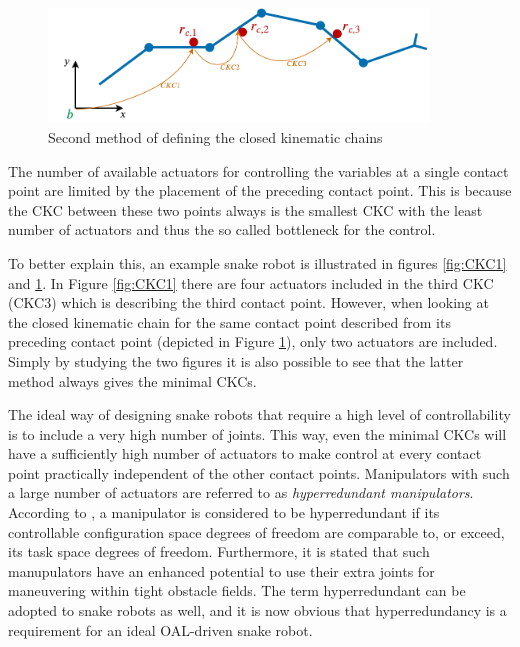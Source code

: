 \begin{figure}
    \centering
    \includegraphics[width=0.9\textwidth]{figures/theory/CKC2.pdf}
    \caption{Second method of defining the closed kinematic chains}
    \label{fig:CKC2}
\end{figure}

The number of available actuators for controlling the variables at a single contact point are limited by the placement of the preceding contact point. This is because the CKC between these two points always is the smallest CKC with the least number of actuators and thus the so called bottleneck for the control.

To better explain this, an example snake robot is illustrated in figures \ref{fig:CKC1} and \ref{fig:CKC2}. In Figure \ref{fig:CKC1} there are four actuators included in the third CKC (CKC3) which is describing the third contact point. However, when looking at the closed kinematic chain for the same contact point described from its preceding contact point (depicted in Figure \ref{fig:CKC2}), only two actuators are included. Simply by studying the two figures it is also possible to see that the latter method always gives the minimal CKCs.

The ideal way of designing snake robots that require a high level of controllability is to include a very high number of joints. This way, even the minimal CKCs will have a sufficiently high number of actuators to make control at every contact point practically independent of the other contact points. Manipulators with such a large number of actuators are referred to as \textit{hyperredundant manipulators}. According to \cite{chiaverini2008kinematically}, a manipulator is considered to be hyperredundant if its controllable configuration space degrees of freedom are comparable to, or exceed, its task space degrees of freedom. Furthermore, it is stated that such manupulators have an enhanced potential to use their extra joints for maneuvering within tight obstacle fields. The term hyperredundant can be adopted to snake robots as well, and it is now obvious that hyperredundancy is a requirement for an ideal OAL-driven snake robot.

